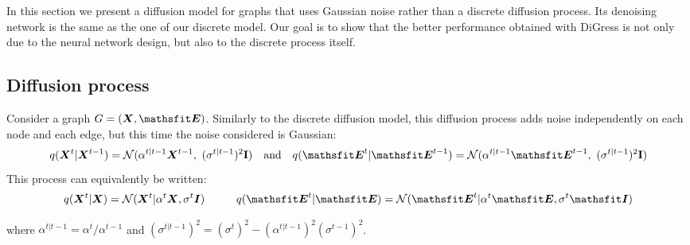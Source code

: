 \documentclass{article} %
\theoremstyle{plain}
\theoremstyle{definition}
\theoremstyle{remark}
\begin{document}
In this section we present a diffusion model for graphs that uses Gaussian noise rather than a discrete diffusion process. Its denoising network is the same as the one of our discrete model. Our goal is to show that the better performance obtained with DiGress is not only due to the neural network design, but also to the discrete process itself. 

\subsection{Diffusion process}

Consider a graph $G=(\mX, \tE)$. Similarly to the discrete diffusion model, this diffusion process adds noise independently on each node and each edge, but this time the noise considered is Gaussian:
\begin{equation}
        q(\mX^{t} | \mX^{t-1}) = \mathcal{N}(\alpha^{t|t-1}\mX^{t-1}, ~(\sigma^{t|t-1})^2 \rmI) \quad \text{and} \quad 
        q(\tE^{t} | \tE^{t-1}) = \mathcal{N}(\alpha^{t|t-1} \tE^{t-1}, ~(\sigma^{t|t-1})^2 \rmI) 
\end{equation}
This process can equivalently be written:
\begin{equation}
 q(\mX^t | \mX) = \mathcal{N}(\mX^t | \alpha^t \mX, \sigma^t \mI)\hspace{1 cm} q(\tE^t | \tE) = \mathcal{N}(\tE^t | \alpha^t \tE, \sigma^t \tI)
\end{equation}

where $\alpha^{t|t-1} = \alpha^{t} / \alpha^{t-1}$ and $(\sigma^{t|t-1})^2 = (\sigma^{t})^2 - (\alpha^{t|t-1})^2 (\sigma^{t-1})^2$.
\end{document}
